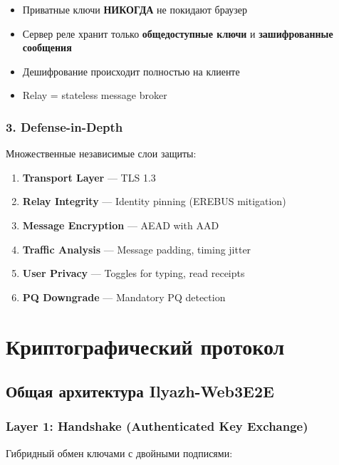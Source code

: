 \documentclass[11pt,a4paper,oneside]{book}
\begin{document}
\begin{itemize}
  \item Приватные ключи \textbf{НИКОГДА} не покидают браузер
  \item Сервер реле хранит только \textbf{общедоступные ключи} и \textbf{зашифрованные сообщения}
  \item Дешифрование происходит полностью на клиенте
  \item Relay = stateless message broker
\end{itemize}
\vspace{-0.2cm}\subsection{3. Defense-in-Depth}
Множественные независимые слои защиты:
\begin{enumerate}
  \item \textbf{Transport Layer} — TLS 1.3
  \item \textbf{Relay Integrity} — Identity pinning (EREBUS mitigation)
  \item \textbf{Message Encryption} — AEAD with AAD
  \item \textbf{Traffic Analysis} — Message padding, timing jitter
  \item \textbf{User Privacy} — Toggles for typing, read receipts
  \item \textbf{PQ Downgrade} — Mandatory PQ detection
\end{enumerate}
\vspace{-0.5cm}\chapter{Криптографический протокол}
\vspace{-0.3cm}\section{Общая архитектура Ilyazh-Web3E2E}
\vspace{-0.2cm}\subsection{Layer 1: Handshake (Authenticated Key Exchange)}
Гибридный обмен ключами с двойными подписями:
\end{document}

